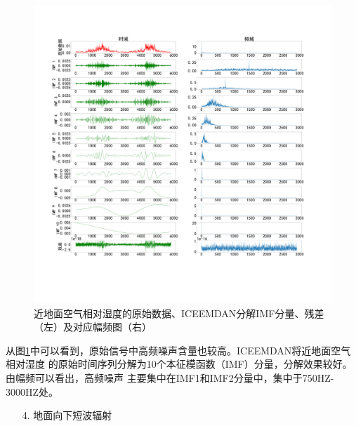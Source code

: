\documentclass[AutoFakeBold]{LZUThesis}
\begin{document}
\begin{figure}[H]
	\centering
    \includegraphics[width=1\textwidth]{figures/shum.pdf}
    \caption{近地面空气相对湿度的原始数据、ICEEMDAN分解IMF分量、残差（左）及对应幅频图（右）}
    \label{fig_shum}
\end{figure}

从图\ref{fig_shum}中可以看到，原始信号中高频噪声含量也较高。ICEEMDAN将近地面空气相对湿度
的原始时间序列分解为10个本征模函数（IMF）分量，分解效果较好。由幅频可以看出，高频噪声
主要集中在IMF1和IMF2分量中，集中于750HZ-3000HZ处。

\begin{itemize}
    \item[4. ] 地面向下短波辐射
\end{itemize}
\end{document}
